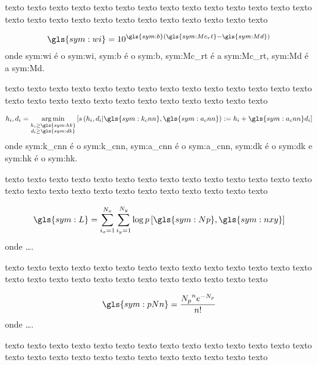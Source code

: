 texto texto texto texto texto texto texto texto texto texto texto texto texto
texto texto texto texto texto texto texto texto texto texto texto texto texto

\begin{equation}
	\ensuremath{ \gls{sym:wi} = 10^{ \gls{sym:b} \left( \gls{sym:Mc_rt} - \gls{sym:Md} \right) } }
	\label{eq:helms_wi}
\end{equation}
onde  \gls{sym:wi} é o \glsdesc{sym:wi}, 
	  \gls{sym:b} é o \glsdesc{sym:b}, 
	  \gls{sym:Mc_rt} é a \glsdesc{sym:Mc_rt}, 
	  \gls{sym:Md} é a \glsdesc{sym:Md}.

texto texto texto texto texto texto texto texto texto texto texto texto texto
texto texto texto texto texto texto texto texto texto texto texto texto texto

\begin{equation}
	\ensuremath{
		h_i, d_i = \argmin_{\substack{h_i \ge \gls{sym:hk} \\
						              d_i \ge \gls{sym:dk}}
				           } 
		\left[ s \left(h_i,d_i 
			 		  \arrowvert
					  \gls{sym:k_cnn},\gls{sym:a_cnn}
			     \right) 
			   := h_i + \gls{sym:a_cnn}d_i 
	    \right]  
	}
	\label{eq:helms_cnn}
\end{equation}
onde \gls{sym:k_cnn} é o \glsdesc{sym:k_cnn},
	 \gls{sym:a_cnn} é o \glsdesc{sym:a_cnn},
	 \gls{sym:dk} é o \glsdesc{sym:dk} e 
	 \gls{sym:hk} é o \glsdesc{sym:hk}.


texto texto texto texto texto texto texto texto texto texto texto texto texto
texto texto texto texto texto texto texto texto texto texto texto texto texto


\begin{equation}
	\ensuremath{
		\gls{sym:L} = \sum_{i_x=1}^{N_x}\sum_{i_y=1}^{N_y}\log p\left[  \gls{sym:Np}, \gls{sym:nxy}  \right]
	}
	\label{eq:loglik}
\end{equation}
onde \ldots.


texto texto texto texto texto texto texto texto texto texto texto texto texto
texto texto texto texto texto texto texto texto texto texto texto texto texto


\begin{equation}
	\ensuremath{
		\gls{sym:pNn} = \frac{{N_p}^n e^{-N_p}}
							 {n!}
	}
	\label{eq:loglik}
\end{equation}
onde \ldots.


texto texto texto texto texto texto texto texto texto texto texto texto texto
texto texto texto texto texto texto texto texto texto texto texto texto texto


